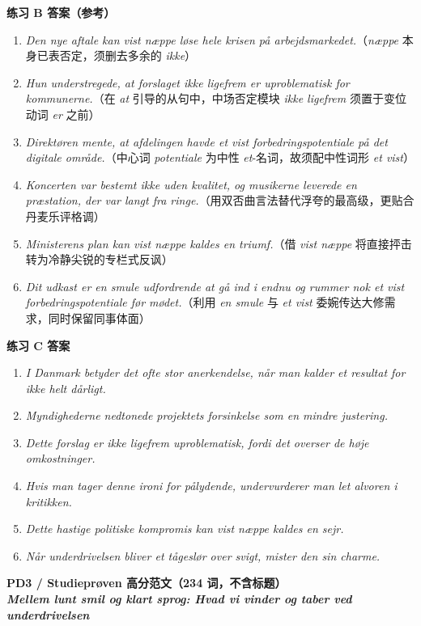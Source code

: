 \begin{answerbox}
\newpage
\textbf{练习 B 答案（参考）}
\begin{enumerate}
  \item \textit{Den nye aftale kan vist næppe løse hele krisen på arbejdsmarkedet.}（\textit{næppe} 本身已表否定，须删去多余的 \textit{ikke}）
  \item \textit{Hun understregede, at forslaget ikke ligefrem er uproblematisk for kommunerne.}（在 \textit{at} 引导的从句中，中场否定模块 \textit{ikke ligefrem} 须置于变位动词 \textit{er} 之前）
  \item \textit{Direktøren mente, at afdelingen havde et vist forbedringspotentiale på det digitale område.}（中心词 \textit{potentiale} 为中性 \textit{et}-名词，故须配中性词形 \textit{et vist}）
  \item \textit{Koncerten var bestemt ikke uden kvalitet, og musikerne leverede en præstation, der var langt fra ringe.}（用双否曲言法替代浮夸的最高级，更贴合丹麦乐评格调）
  \item \textit{Ministerens plan kan vist næppe kaldes en triumf.}（借 \textit{vist næppe} 将直接抨击转为冷静尖锐的专栏式反讽）
  \item \textit{Dit udkast er en smule udfordrende at gå ind i endnu og rummer nok et vist forbedringspotentiale før mødet.}（利用 \textit{en smule} 与 \textit{et vist} 委婉传达大修需求，同时保留同事体面）
\end{enumerate}

\textbf{练习 C 答案}
\begin{enumerate}
  \item \textit{I Danmark betyder det ofte stor anerkendelse, når man kalder et resultat for ikke helt dårligt.}
  \item \textit{Myndighederne nedtonede projektets forsinkelse som en mindre justering.}
  \item \textit{Dette forslag er ikke ligefrem uproblematisk, fordi det overser de høje omkostninger.}
  \item \textit{Hvis man tager denne ironi for pålydende, undervurderer man let alvoren i kritikken.}
  \item \textit{Dette hastige politiske kompromis kan vist næppe kaldes en sejr.}
  \item \textit{Når underdrivelsen bliver et tågeslør over svigt, mister den sin charme.}
\end{enumerate}

\textbf{PD3 / Studieprøven 高分范文（234 词，不含标题）}\\
\textit{\textbf{Mellem lunt smil og klart sprog: Hvad vi vinder og taber ved underdrivelsen}}


\end{answerbox}
